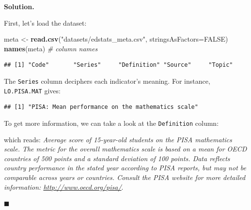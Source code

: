 \documentclass[10pt,b5paper,krantz1]{krantz}
\newenvironment{Shaded}{\begin{snugshade}}{\end{snugshade}}
\newcommand{\CommentTok}[1]{\textcolor[rgb]{0.37,0.37,0.37}{\textit{#1}}}
\newcommand{\DataTypeTok}[1]{\textcolor[rgb]{0.27,0.27,0.27}{#1}}
\newcommand{\KeywordTok}[1]{\textcolor[rgb]{0.27,0.27,0.27}{\textbf{#1}}}
\newcommand{\NormalTok}[1]{#1}
\newcommand{\OperatorTok}[1]{\textcolor[rgb]{0.43,0.43,0.43}{\textbf{#1}}}
\newcommand{\OtherTok}[1]{\textcolor[rgb]{0.37,0.37,0.37}{#1}}
\newcommand{\StringTok}[1]{\textcolor[rgb]{0.5,0.5,0.5}{#1}}
\newenvironment{solution}{%
\bigskip\noindent\textbf{Solution. }%
\it\ignorespaces%
\ignorespaces%
}{\ignorespaces%
\hfill$\blacksquare$%
}
\begin{document}
\begin{solution}

First, let's load the dataset:

\begin{Shaded}
\begin{Highlighting}[]
\NormalTok{meta <-}\StringTok{ }\KeywordTok{read.csv}\NormalTok{(}\StringTok{"datasets/edstats_meta.csv"}\NormalTok{, }\DataTypeTok{stringsAsFactors=}\OtherTok{FALSE}\NormalTok{)}
\KeywordTok{names}\NormalTok{(meta) }\CommentTok{# column names}
\end{Highlighting}
\end{Shaded}

\begin{verbatim}
## [1] "Code"       "Series"     "Definition" "Source"     "Topic"
\end{verbatim}

The \texttt{Series} column deciphers each indicator's meaning.
For instance, \texttt{LO.PISA.MAT} gives:

\begin{Shaded}
\end{Shaded}

\begin{verbatim}
## [1] "PISA: Mean performance on the mathematics scale"
\end{verbatim}

To get more information, we can take a look at the \texttt{Definition}
column:

\begin{Shaded}
\end{Shaded}

which reads:
\emph{Average score of 15-year-old students on the PISA mathematics scale. The metric for the overall mathematics scale is based on a mean for OECD countries of 500 points and a standard deviation of 100 points. Data reflects country performance in the stated year according to PISA reports, but may not be comparable across years or countries. Consult the PISA website for more detailed information: \url{http://www.oecd.org/pisa/}}.

\end{solution}
\end{document}
